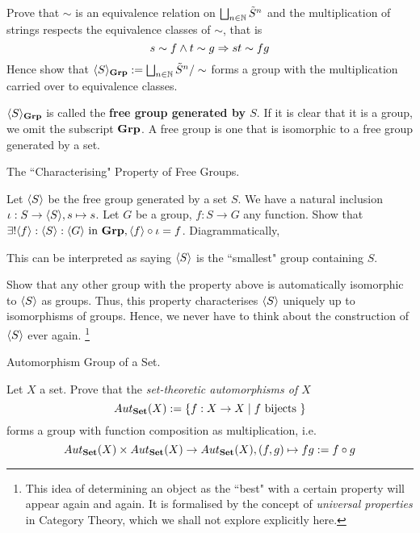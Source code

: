\documentclass[../book.tex]{subfiles}
\begin{document}
\begin{ex}
    Prove that $\sim$ is an equivalence relation on 
    $\bigsqcup_{n \in \mathbb{N}} \tilde{S}^n$
    and the multiplication of strings respects the equivalence classes of $\sim$,
    that is
    \[
        s \sim f \land t \sim g \Rightarrow st \sim fg
    \]
    Hence show that $\langle S \rangle_{\mathbf{Grp}} := 
    \bigsqcup_{n \in \mathbb{N}} \tilde{S}^n / \sim$
    forms a group with the multiplication carried over to equivalence classes. 
    
    $\langle S \rangle_{\mathbf{Grp}}$ is called the \textbf{free group generated by $S$}. 
    If it is clear that it is a group, we omit the subscript $\mathbf{Grp}$.
    A free group is one that is isomorphic to a free group generated by a set. 
\end{ex}

\begin{ex} \dolater The ``Characterising" Property of Free Groups. 

    Let $\langle S \rangle$ be the free group generated by a set $S$. 
    We have a natural inclusion $\iota : S \to \langle S \rangle, s \mapsto s$.
    Let $G$ be a group, $f : S \to G$ any function. 
    Show that 
    $\exists ! \langle f \rangle : \langle S \rangle : \langle G\rangle \text{ in } \mathbf{Grp}, 
    \langle f \rangle \circ \iota = f$. 
    Diagrammatically, 
    \begin{figure} [ht]
        \centering
    \end{figure}
    
    This can be interpreted as saying $\langle S \rangle$ is the 
    ``smallest" group containing $S$. 
    
    Show that any other group with the property above is automatically
    isomorphic to $\langle S \rangle$ as groups. 
    Thus, this property characterises $\langle S \rangle$ uniquely
    up to isomorphisms of groups. 
    Hence, we never have to think about 
    the construction of $\langle S \rangle$ ever again.
    \footnote{
        This idea of determining an object
        as the ``best" with a certain property will appear again and again. 
        It is formalised by the concept of \emph{universal properties} in Category Theory,
        which we shall not explore explicitly here. 
    }
\end{ex}

\begin{ex} Automorphism Group of a Set. 

    Let $X$ a set. Prove that the \emph{set-theoretic automorphisms of $X$}
    \[Aut_{\mathbf{Set}}(X) := \{f : X \to X \mid f \text{ bijects }\}\] forms a group
    with function composition as multiplication, i.e.
    \[
        Aut_{\mathbf{Set}}(X) \times Aut_{\mathbf{Set}}(X) \to Aut_{\mathbf{Set}}(X), 
        (f, g) \mapsto fg := f \circ g
    \]
\end{ex}
\end{document}
